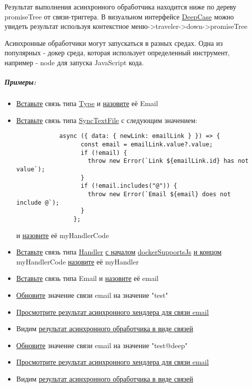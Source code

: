 \documentclass{article}
\begin{document}
\hypertarget{Handlers.Async.HowToGetResult}{}Результат выполнения асинхронного
обработчика находится ниже по дереву
promiseTree от связи-триггера. В визуальном интерфейсе
\hyperlink{DeepCase.Description}{DeepCase} можно увидеть
результат используя контекстное меню->traveler->down->promiseTree

Асинхронные обработчики могут запускаться в разных средах. Одна из популярных -
докер среда, которая использует определенный инструмент, например - node для
запуска JavaScript кода.
\subparagraph{Примеры:}
\begin{itemize}
  \item \hyperlink{DeepCase.InsertLink.Description}{Вставьте} связь типа
        \hyperlink{Core.Type.Description}{Type} и
        \hyperlink{FAQ.HowToSetName}{назовите} её Email
  \item \hyperlink{DeepCase.InsertLink.Description}{Вставьте} связь типа
        \hyperlink{Core.SyncTextFile.Description}{SyncTextFile} с следующим
        значением:
        \begin{lstlisting}
            async ({ data: { newLink: emailLink } }) => {
                  const email = emailLink.value?.value;
                  if (!email) {
                    throw new Error(`Link ${emailLink.id} has not value`);
                  }
                  if (!email.includes("@")) {
                    throw new Error(`Email ${email} does not include @`);
                  }
                };
            \end{lstlisting}
        и \hyperlink{FAQ.HowToSetName}{назовите} её myHandlerCode
  \item \hyperlink{DeepCase.InsertLink.Description}{Вставьте} связь типа
        \hyperlink{Core.Handler.Description}{Handler}
        \hyperlink{FAQ.HowToInsertLinkWithFromAndTo}{с началом}
        \hyperlink{Core.dockerSupportsJs.Description}{dockerSupportsJs}
        \hyperlink{FAQ.HowToInsertLinkWithFromAndTo}{и
          концом}
        myHandlerCode \hyperlink{FAQ.HowToSetName}{назовите} её myHandler
  \item \hyperlink{DeepCase.InsertLink.Description}{Вставьте} связь типа
        Email и \hyperlink{FAQ.HowToSetName}{назовите} её email
  \item \hyperlink{DeepCase.UpdateLink.Description}{Обновите} значение
        связи email на значение "test"
  \item \hyperlink{Handlers.Async.HowToGetResult}{Просмотрите результат
          асинхронного хендлера для связи email}
  \item Видим \hyperlink{Handlers.Async.Result}{результат асинхронного
          обработчика в виде связей}
  \item \hyperlink{DeepCase.UpdateLink.Description}{Обновите} значение
        связи email на значение "test@deep"
  \item \hyperlink{Handlers.Async.HowToGetResult}{Просмотрите результат
          асинхронного хендлера для связи email}
  \item Видим \hyperlink{Handlers.Async.Result}{результат асинхронного
          обработчика в виде связей}
\end{itemize}
\end{document}
